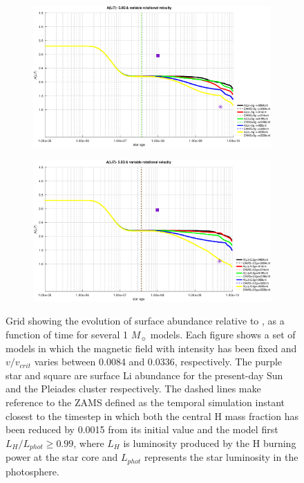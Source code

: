 \documentclass[fleqn,usenatbib]{mnras}
\begin{document}
\begin{figure}
    \begin{subfigure}[h]{0.47\textwidth}
    \includegraphics[width=\textwidth]{figures/li_var_vel_5_0g.eps}
    \label{fig:subim5}
    \end{subfigure}
    \begin{subfigure}[h]{0.47\textwidth}
    \includegraphics[width=\textwidth]{figures/li_var_vel_5_5g.eps}
    \label{fig:subim6}
    \end{subfigure}
\caption{Grid showing the evolution of surface  abundance relative to , as a function of time for several 1 $M_{\sun}$ models. Each figure shows a set of models in which the magnetic field with intensity has been fixed and $v/v_{crit}$ varies between 0.0084 and 0.0336, respectively. The purple star and square are surface Li abundance for the present-day Sun \citep{Asplund2009} and the Pleiades cluster \citep{Sestito2005} respectively. The dashed lines make reference to the ZAMS defined as the temporal simulation instant closest to the timestep in which both the central H mass fraction has been reduced by 0.0015 from its initial value and the model first $L_H/L_{phot} \geq 0.99$, where $L_{H}$ is luminosity produced by the H burning power at the star core and $L_{phot}$ represents the star luminosity in the photosphere.}
\label{fig:image2}
\end{figure}
\par
\end{document}
